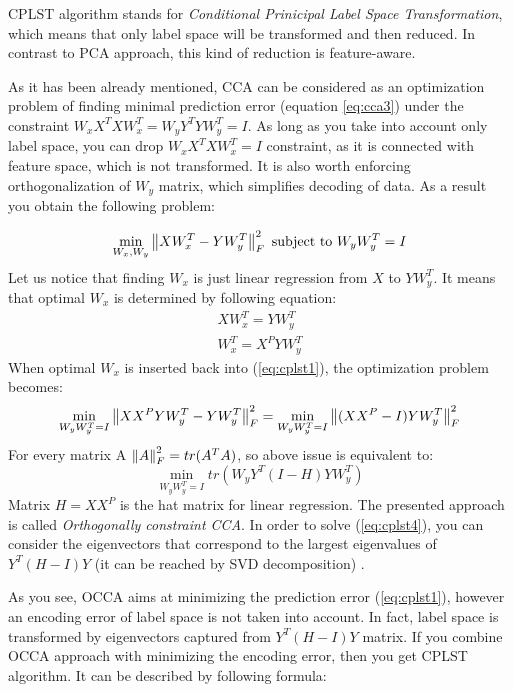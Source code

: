 CPLST algorithm stands for \textit{Conditional Prinicipal Label Space Transformation}, which means that only label space will be transformed and then reduced. In contrast to PCA approach, this kind of reduction is feature-aware. 

As it has been already mentioned, CCA can be considered as an optimization problem of finding minimal prediction error (equation \ref{eq:cca3}) under the constraint $W_xX^TXW_x^T=W_yY^TYW_y^T=I$. As long as you take into account only label space, you can drop $W_xX^TXW_x^T=I$ constraint, as it is connected with feature space, which is not transformed. It is also worth enforcing orthogonalization of $W_y$ matrix, which simplifies decoding of data. As a result you obtain the following problem:

\begin{equation}\label{eq:cplst1}
    \min_{W_x, W_y} \left\lVert XW_x^T-YW_y^T\right\rVert_{F}^2  
    \text{  subject to   } W_yW_y^T=I   
\end{equation}
Let us notice that finding $W_x$ is just linear regression from $X$ to $YW_y^T$. It means that optimal $W_x$ is determined by following equation:
\begin{equation}\label{eq:cplst2}
\begin{split}
    XW_x^T=YW_y^T \\
    W_x^T=X^PYW_y^T
\end{split}
\end{equation}
When optimal $W_x$ is inserted back into (\ref{eq:cplst1}), the optimization problem becomes:
\begin{equation}\label{eq:cplst3}
    \min_{W_yW_y^T=I} \left\lVert XX^PYW_y^T-YW_y^T\right\rVert_{F}^2=\min_{W_yW_y^T=I} \left\lVert(XX^P-I)YW_y^T\right\rVert_{F}^2
\end{equation}
For every matrix A $\left\lVert A\right\rVert_{F}^2=tr(A^TA)$, so above issue is equivalent to:
\begin{equation}\label{eq:cplst4}
    \min_{W_yW_y^T=I} tr(W_yY^T(I-H)YW_y^T)
\end{equation}
Matrix $H=XX^P$ is the hat matrix for linear regression. The presented approach is called \textit{Orthogonally constraint CCA}. In order to solve (\ref{eq:cplst4}), you can consider the eigenvectors that correspond to the largest eigenvalues of $Y^T(H-I)Y$ (it can be reached by SVD decomposition) \cite{ChenLin}.

As you see, OCCA aims at minimizing the prediction error (\ref{eq:cplst1}), however an encoding error of label space is not taken into account. In fact, label space is transformed by eigenvectors captured from $Y^T(H-I)Y$ matrix. If you combine OCCA approach with minimizing the encoding error, then you get CPLST algorithm. It can be described by following formula:

